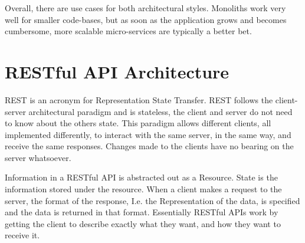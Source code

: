 Overall, there are use cases for both architectural styles. Monoliths work very well for smaller code-bases, but as soon as the application grows and becomes cumbersome, more scalable micro-services are typically a better bet.

\section{RESTful API Architecture}

REST is an acronym for Representation State Transfer. REST follows the client-server architectural paradigm and is stateless, the client and server do not need to know about the others state. This paradigm allows different clients, all implemented differently, to interact with the same server, in the same way, and receive the same responses. Changes made to the clients have no bearing on the server whatsoever.

Information in a RESTful API is abstracted out as a Resource. State is the information stored under the resource. When a client makes a request to the server, the format of the response, I.e. the Representation of the data, is specified and the data is returned in that format. Essentially RESTful APIs work by getting the client to describe exactly what they want, and how they want to receive it.
